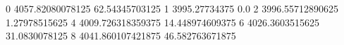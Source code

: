 0 4057.82080078125 62.54345703125
1 3995.27734375 0.0
2 3996.55712890625 1.27978515625
4 4009.726318359375 14.448974609375
6 4026.3603515625 31.0830078125
8 4041.860107421875 46.582763671875

